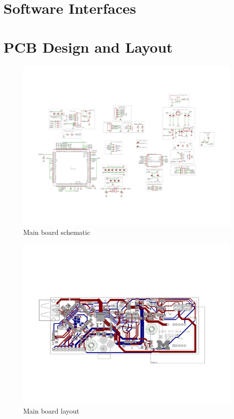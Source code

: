 \documentclass[12pt]{article}
\begin{document}
\newpage

\section{Software Interfaces}

\newpage

\section{PCB Design and Layout}

\begin{figure}[h]
    \centering
    \includegraphics[angle=-90,width=0.99\textwidth]{BodyCamBoard_sch}
    \caption{Main board schematic}
\end{figure}

\begin{figure}[h]
    \centering
    \includegraphics[angle=-90,width=0.99\textwidth]{BodyCamBoard_brd}
    \caption{Main board layout}
\end{figure}
\end{document}
